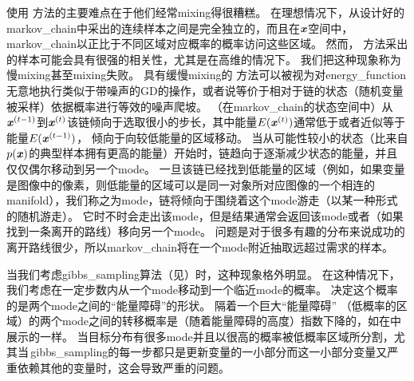使用\,\,方法的主要难点在于他们经常\gls{mixing}得很糟糕。
在理想情况下，从设计好的\gls{markov_chain}中采出的连续样本之间是完全独立的，而且在$\boldsymbol{\mathit{x}}$空间中，\gls{markov_chain}以正比于不同区域对应概率的概率访问这些区域。
然而，\,\,方法采出的样本可能会具有很强的相关性，尤其是在高维的情况下。
我们把这种现象称为慢\gls{mixing}甚至\gls{mixing}失败。
具有缓慢\gls{mixing}的\,\,方法可以被视为对\gls{energy_function}无意地执行类似于带噪声的\gls{GD}的操作，或者说等价于相对于链的状态（随机变量被采样）依据概率进行等效的噪声爬坡。
（在\gls{markov_chain}的状态空间中）从$\boldsymbol{\mathit{x}}^{(t-1)}$到$\boldsymbol{\mathit{x}}^{(t)}$该链倾向于选取很小的步长，其中能量$E(\boldsymbol{\mathit{x}}^{(t)})$通常低于或者近似等于能量$E(\boldsymbol{\mathit{x}}^{(t-1)})$，
倾向于向较低能量的区域移动。
当从可能性较小的状态（比来自$p(\boldsymbol{\mathit{x}})$的典型样本拥有更高的能量）开始时，链趋向于逐渐减少状态的能量，并且仅仅偶尔移动到另一个\gls{mode}。 %
一旦该链已经找到低能量的区域（例如，如果变量是图像中的像素，则低能量的区域可以是同一对象所对应图像的一个相连的\gls{manifold}），我们称之为\gls{mode}，链将倾向于围绕着这个\gls{mode}游走（以某一种形式的随机游走）。 %
它时不时会走出该\gls{mode}，但是结果通常会返回该\gls{mode}或者（如果找到一条离开的路线）移向另一个\gls{mode}。
问题是对于很多有趣的分布来说成功的离开路线很少，所以\gls{markov_chain}将在一个\gls{mode}附近抽取远超过需求的样本。


当我们考虑\gls{gibbs_sampling}算法（见）时，这种现象格外明显。 %
在这种情况下，我们考虑在一定步数内从一个\gls{mode}移动到一个临近\gls{mode}的概率。
决定这个概率的是两个\gls{mode}之间的``能量障碍''的形状。
隔着一个巨大``能量障碍'' （低概率的区域）的两个\gls{mode}之间的转移概率是（随着能量障碍的高度）指数下降的，如在中展示的一样。
当目标分布有很多\gls{mode}并且以很高的概率被低概率区域所分割，尤其当\,\gls{gibbs_sampling}的每一步都只是更新变量的一小部分而这一小部分变量又严重依赖其他的变量时，这会导致严重的问题。   %


